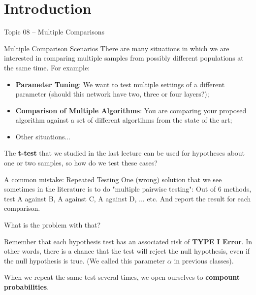 \section{Introduction}

\begin{frame}{}
  \centering
  Topic 08 -- Multiple Comparisons
\end{frame}


\begin{frame}{Multiple Comparison Scenarios}
  There are many situations in which we are interested in comparing multiple samples from possibly different populations at the same time. For example:
  \begin{itemize}
    \item {\bf Parameter Tuning}: We want to test multiple settings of a different parameter (should this network have two, three or four layers?);
    \item {\bf Comparison of Multiple Algorithms}: You are comparing your proposed algorithm against a set of different algortihms from the state of the art;
    \item Other situations...
  \end{itemize}\bigskip

  The {\bf t-test} that we studied in the last lecture can be used for hypotheses about one or two samples, so how do we test these cases?
\end{frame}

\begin{frame}{A common mistake: Repeated Testing}
  One (wrong) solution that we see sometimes in the literature is to do "multiple pairwise testing": Out of 6 methods, test A against B, A against C, A against D, ... etc. And report the result for each comparison.\bigskip

  What is the problem with that?\bigskip

  Remember that each hypothesis test has an associated risk of {\bf TYPE I Error}. In other words, there is a chance that the test will reject the null hypothesis, even if the null hypothesis is true. (We called this parameter $\alpha$ in previous classes).\bigskip

  When we repeat the same test several times, we open ourselves to {\bf compount probabilities}.
\end{frame}

